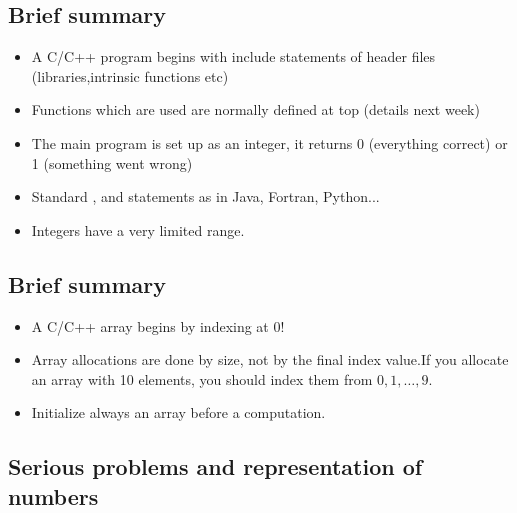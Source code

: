 \documentclass[%
twoside,                 %
final,                   %
10pt]{article}
\newenvironment{block_mdfboxadmon}[1][]{
\begin{block_mdfboxmdframed}[frametitle=#1]
}
{
\end{block_mdfboxmdframed}
}
\begin{document}
\subsection{Brief summary}


\begin{block_mdfboxadmon}[C/C++ program.]
\begin{itemize}
  \item A C/C++ program begins with include statements of header files (libraries,intrinsic functions etc)

  \item Functions which are used are normally defined at top (details next week)

  \item The main program is set up as an integer, it returns 0 (everything correct) or 1 (something went wrong)

  \item Standard ,  and  statements as in Java, Fortran, Python...

  \item Integers have a very limited range.
\end{itemize}

\noindent
\end{block_mdfboxadmon}



\subsection{Brief summary}


\begin{block_mdfboxadmon}[Arrays.]
\begin{itemize}
  \item A C/C++ array begins by indexing at 0!

  \item Array allocations are done by size, not by the final index value.If you allocate an array with 10 elements, you should index them from $0,1,\dots, 9$.

  \item Initialize always an array before a computation.
\end{itemize}

\noindent
\end{block_mdfboxadmon}



\subsection{Serious problems and representation of numbers}
\end{document}
